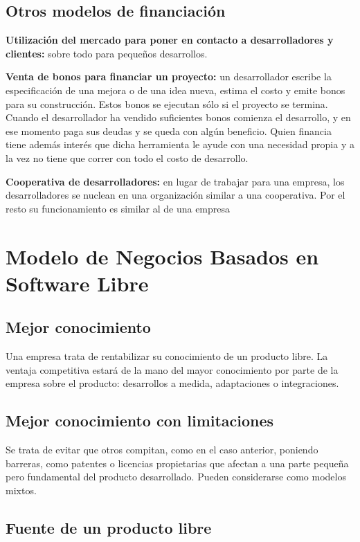 \subsection{Otros modelos de financiación}

{\bf Utilización del mercado para poner en contacto a desarrolladores y clientes: } sobre todo para pequeños desarrollos.

{\bf Venta de bonos para financiar un proyecto: } un desarrollador escribe la especificación de una mejora o de una idea nueva, estima el costo y emite bonos para su construcción. Estos bonos se ejecutan sólo si el proyecto se termina. Cuando el desarrollador ha vendido suficientes bonos comienza el desarrollo, y en ese momento paga sus deudas y se queda con algún beneficio. Quien financia tiene además interés que dicha herramienta le ayude con una necesidad propia y a la vez no tiene que correr con todo el costo de desarrollo.

{\bf Cooperativa de desarrolladores: } en lugar de trabajar para una empresa, los desarrolladores se nuclean en una organización similar a una cooperativa. Por el resto su funcionamiento es similar al de una empresa



\section{Modelo de Negocios Basados en Software Libre}

\subsection{Mejor conocimiento} 

Una empresa trata de rentabilizar su conocimiento de un producto libre. La ventaja competitiva estará de la mano del mayor conocimiento por parte de la empresa sobre el producto: desarrollos a medida, adaptaciones o integraciones.

\subsection{Mejor conocimiento con limitaciones} 

Se trata de evitar que otros compitan, como en el caso anterior, poniendo barreras, como patentes o licencias propietarias que afectan a una parte pequeña pero fundamental del producto desarrollado. Pueden considerarse como modelos mixtos. 

\subsection{Fuente de un producto libre}

